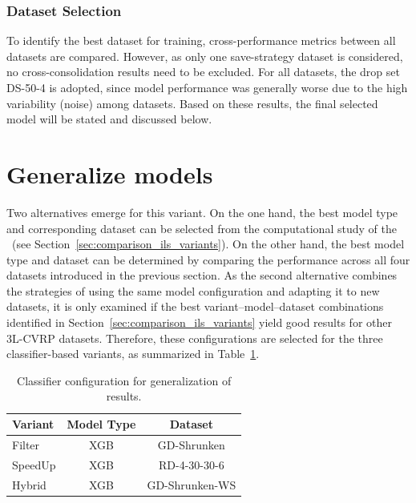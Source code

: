 \subsubsection{Dataset Selection}

To identify the best dataset for training, cross-performance metrics between all datasets are compared. However,
as only one save-strategy dataset is considered, no cross-consolidation results need to be excluded. For all datasets,
the drop set DS-50-4 is adopted, since model performance was generally worse due to the high variability (noise) among datasets.
\parbreak
Based on these results, the final selected model will be stated and discussed below.

\section{Generalize \gendreauDataSetText models}
\label{sec:krebs_data_pretrained_models}

Two alternatives emerge for this variant. On the one hand, the best model type and corresponding dataset can be selected
from the computational study of the \gendreauDataSetText~(see Section~\ref{sec:comparison_ils_variants}). On the other hand, the
best model type and dataset can be determined by comparing the performance across all four datasets introduced in the previous section.
As the second alternative combines the strategies of using the same model configuration and adapting it to new datasets, it is
only examined if the best variant–model–dataset combinations identified in Section~\ref{sec:comparison_ils_variants} yield good
results for other \gls{3L-CVRP} datasets. Therefore, these configurations are selected for the three classifier-based variants,
as summarized in Table~\ref{tab:model_configuration_krebs}.

\begin{table}[ht]
    \centering
    \begin{tabular}{l c c  }
        \toprule
        Variant & Model Type & Dataset        \\
        \midrule
        Filter  & XGB        & GD-Shrunken    \\
        SpeedUp & XGB        & RD-4-30-30-6   \\
        Hybrid  & XGB        & GD-Shrunken-WS \\

        \bottomrule
    \end{tabular}
    \caption{Classifier configuration for generalization of \gendreauDataSetText results.}
    \label{tab:model_configuration_krebs}
\end{table}

